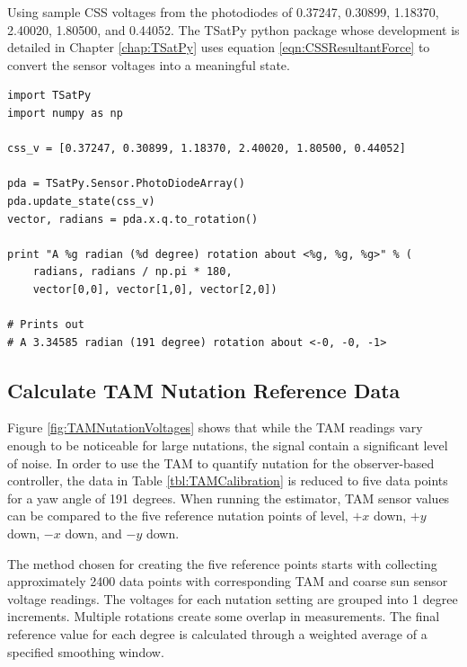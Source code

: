 Using sample CSS voltages from the photodiodes of 0.37247, 0.30899, 1.18370, 2.40020, 1.80500, and 0.44052.  The TSatPy python package whose development is detailed in Chapter \ref{chap:TSatPy} uses equation \ref{eqn:CSSResultantForce} to convert the sensor voltages into a meaningful state.

\begin{singlespace}
  \begin{verbatim}
import TSatPy
import numpy as np

css_v = [0.37247, 0.30899, 1.18370, 2.40020, 1.80500, 0.44052]

pda = TSatPy.Sensor.PhotoDiodeArray()
pda.update_state(css_v)
vector, radians = pda.x.q.to_rotation()

print "A %g radian (%d degree) rotation about <%g, %g, %g>" % (
    radians, radians / np.pi * 180,
    vector[0,0], vector[1,0], vector[2,0])

# Prints out
# A 3.34585 radian (191 degree) rotation about <-0, -0, -1>
  \end{verbatim}
  \nocite{minted}
\end{singlespace}

\subsection{Calculate TAM Nutation Reference Data}
\label{subsec:CalculateTAMNutationReferenceData}

Figure \ref{fig:TAMNutationVoltages} shows that while the TAM readings vary enough to be noticeable for large nutations, the signal contain a significant level of noise.  In order to use the TAM to quantify nutation for the observer-based controller, the data in Table \ref{tbl:TAMCalibration} is reduced to five data points for a yaw angle of 191 degrees.  When running the estimator, TAM sensor values can be compared to the five reference nutation points of level, $+x$ down, $+y$ down, $-x$ down, and $-y$ down.

The method chosen for creating the five reference points starts with collecting approximately 2400 data points with corresponding TAM and coarse sun sensor voltage readings.  The voltages for each nutation setting are grouped into 1 degree increments.  Multiple rotations create some overlap in measurements.  The final reference value for each degree is calculated through a weighted average of a specified smoothing window.

